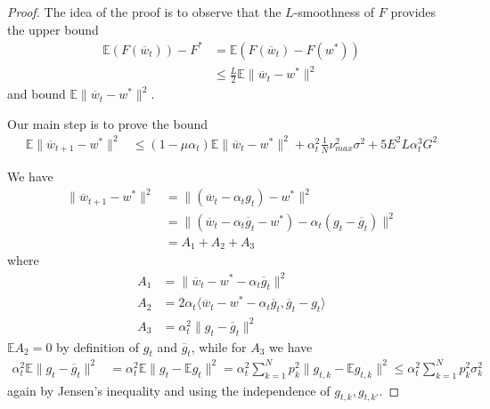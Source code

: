 \begin{proof}
		The idea of the proof is to observe that the $L$-smoothness of $F$
		provides the upper bound
		\begin{align*}
		\mathbb{E}(F(\overline{w}_{t}))-F^{\ast} & =\mathbb{E}(F(\overline{w}_{t})-F(w^{\ast}))\\
		& \leq\frac{L}{2}\mathbb{E}\|\overline{w}_{t}-w^{\ast}\|^{2}
		\end{align*}
		and bound $\mathbb{E}\|\overline{w}_{t}-w^{\ast}\|^{2}$. 
		
		Our main step is to prove the bound 
		\begin{align*}
		\mathbb{E}\|\overline{w}_{t+1}-w^{\ast}\|^{2} & \leq(1-\mu\alpha_{t})\mathbb{E}\|\overline{w}_{t}-w^{\ast}\|^{2}+\alpha_{t}^{2}\frac{1}{N}\nu_{max}^{2}\sigma^{2}+5E^{2}L\alpha_{t}^{3}G^{2}
		\end{align*}
		
		We have 
		\begin{align*}
		\|\overline{w}_{t+1}-w^{\ast}\|^{2} & =\|(\overline{w}_{t}-\alpha_{t}g_{t})-w^{\ast}\|^{2}\\
		& =\|(\overline{w}_{t}-\alpha_{t}\overline{g}_{t}-w^{\ast})-\alpha_{t}(g_{t}-\overline{g}_{t})\|^{2}\\
		& =A_{1}+A_{2}+A_{3}
		\end{align*}
		where 
		\begin{align*}
		A_{1} & =\|\overline{w}_{t}-w^{\ast}-\alpha_{t}\overline{g}_{t}\|^{2}\\
		A_{2} & =2\alpha_{t}\langle\overline{w}_{t}-w^{\ast}-\alpha_{t}\overline{g}_{t},\overline{g}_{t}-g_{t}\rangle\\
		A_{3} & =\alpha_{t}^{2}\|g_{t}-\overline{g}_{t}\|^{2}
		\end{align*}
		$\mathbb{E}A_{2}=0$ by definition of $g_{t}$ and $\overline{g}_{t}$,
		while for $A_{3}$ we have
		\begin{align*}
		\alpha_{t}^{2}\mathbb{E}\|g_{t}-\overline{g}_{t}\|^{2} & =\alpha_{t}^{2}\mathbb{E}\|g_{t}-\mathbb{E}g_{t}\|^{2}=\alpha_{t}^{2}\sum_{k=1}^{N}p_{k}^{2}\|g_{t,k}-\mathbb{E}g_{t,k}\|^{2}\leq\alpha_{t}^{2}\sum_{k=1}^{N}p_{k}^{2}\sigma_{k}^{2}
		\end{align*}
		again by Jensen's inequality and using the independence of $g_{t,k},g_{t,k'}$. 
		

\end{proof}
